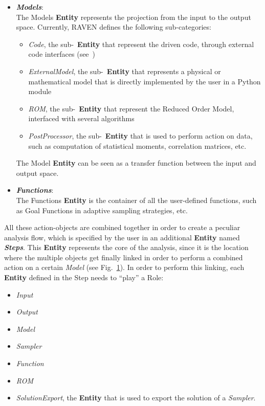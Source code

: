 \begin{itemize}
\begin{figure}[h!]
  \label{fig:ExampleStepEntity}
\end{figure}
  \item \textit{\textbf{Models}}:
  \\ The Models \textbf{Entity}  represents the projection from the input to the output space. Currently, RAVEN defines the
  following sub-categories:
      \begin{itemize}
       \item \textit{Code}, the sub-~\textbf{Entity} that represent the driven code, through external code interfaces (see~\cite{RAVENuserManual})
       \item  \textit{ExternalModel}, the sub-~\textbf{Entity} that represents a physical or mathematical model that is
       directly implemented by the user in a Python module
      \item \textit{ROM}, the sub-~\textbf{Entity} that represent the Reduced Order Model, interfaced with several algorithms
       \item \textit{PostProcessor}, the sub-~\textbf{Entity} that is used to perform action on data, such as computation of
       statistical moments, correlation matrices, etc.
      \end{itemize}
      The Model \textbf{Entity} can be seen as a transfer function between the input and output space.
  \item \textit{\textbf{Functions}}:
   \\ The Functions \textbf{Entity} is the container of all the user-defined functions, such as Goal Functions in adaptive
   sampling strategies, etc.
\end{itemize}
All these action-objects are combined together in order to create a peculiar analysis flow, which is specified
by the user in an additional \textbf{Entity} named \textit{\textbf{Steps}}. This \textbf{Entity} represents the core of the analysis, since it is the location where the multiple objects get finally linked in order to perform a combined action on a certain \textit{Model} (see Fig.~\ref{fig:ExampleStepEntity}). In order to perform this linking, each \textbf{Entity} defined in the Step needs to ``play'' a Role:
\begin{itemize}
  \item \textit{Input}
  \item \textit{Output}
  \item \textit{Model}
  \item \textit{Sampler}
  \item \textit{Function}
  \item \textit{ROM}
  \item \textit{SolutionExport}, the \textbf{Entity} that is used to export the solution of a \textit{Sampler}.
\end{itemize}
